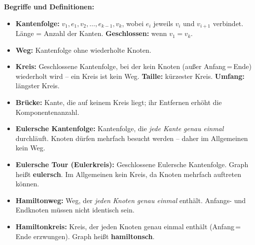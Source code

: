 \textbf{Begriffe und Definitionen:}
\begin{itemize}[leftmargin=1.5em]
    \item \textbf{Kantenfolge:} $v_1, e_1, v_2, \ldots, e_{k-1}, v_k$, wobei $e_i$ jeweils $v_i$ und $v_{i+1}$ verbindet. Länge = Anzahl der Kanten. \textbf{Geschlossen:} wenn $v_1 = v_k$.
    \item \textbf{Weg:} Kantenfolge ohne wiederholte Knoten.
    \item \textbf{Kreis:} Geschlossene Kantenfolge, bei der kein Knoten (außer Anfang\,=\,Ende) wiederholt wird -- ein Kreis ist kein Weg. \textbf{Taille:} kürzester Kreis. \textbf{Umfang:} längster Kreis.
    \item \textbf{Brücke:} Kante, die auf keinem Kreis liegt; ihr Entfernen erhöht die Komponentenanzahl.
    \item \textbf{Eulersche Kantenfolge:} Kantenfolge, die \emph{jede Kante genau einmal} durchläuft. Knoten dürfen mehrfach besucht werden -- daher im Allgemeinen kein Weg.
    \item \textbf{Eulersche Tour (Eulerkreis):} Geschlossene Eulersche Kantenfolge. Graph heißt \textbf{eulersch}. Im Allgemeinen kein Kreis, da Knoten mehrfach auftreten können.
    \item \textbf{Hamiltonweg:} Weg, der \emph{jeden Knoten genau einmal} enthält. Anfangs- und Endknoten müssen nicht identisch sein.
    \item \textbf{Hamiltonkreis:} Kreis, der jeden Knoten genau einmal enthält (Anfang\,=\,Ende erzwungen). Graph heißt \textbf{hamiltonsch}.
\end{itemize}




